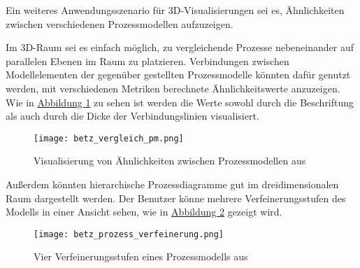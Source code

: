 \documentclass[a4paper,10pt]{sphinxmanual}
\begin{document}
Ein weiteres Anwendungsszenario für 3D-Visualisierungen sei es, Ähnlichkeiten zwischen verschiedenen Prozessmodellen aufzuzeigen.

Im 3D-Raum sei es einfach möglich, zu vergleichende Prozesse nebeneinander auf parallelen Ebenen im Raum zu platzieren.
Verbindungen zwischen Modellelementen der gegenüber gestellten Prozessmodelle könnten dafür genutzt werden, mit verschiedenen Metriken berechnete Ähnlichkeitswerte anzuzeigen.
Wie in \hyperref[related:betz-vergleich-pm]{Abbildung  \ref*{related:betz-vergleich-pm}} zu sehen ist werden die Werte sowohl durch die Beschriftung als auch durch die Dicke der Verbindungslinien visualisiert.
\begin{figure}[htbp]
\centering
\capstart

\texttt{[image: betz\_vergleich\_pm.png]}
\caption{Visualisierung von Ähnlichkeiten zwischen Prozessmodellen aus \cite{betz_3d_2008}}\label{related:betz-vergleich-pm}\end{figure}

Außerdem könnten hierarchische Prozessdiagramme gut im dreidimensionalen Raum dargestellt werden.
Der Benutzer könne mehrere Verfeinerungsstufen des Modells in einer Ansicht sehen, wie in \hyperref[related:betz-prozess-verfeinerung]{Abbildung  \ref*{related:betz-prozess-verfeinerung}} gezeigt wird.
\begin{figure}[htbp]
\centering
\capstart

\texttt{[image: betz\_prozess\_verfeinerung.png]}
\caption{Vier Verfeinerungsstufen eines Prozessmodells aus \cite{betz_3d_2008}}\label{related:betz-prozess-verfeinerung}\end{figure}
\end{document}
